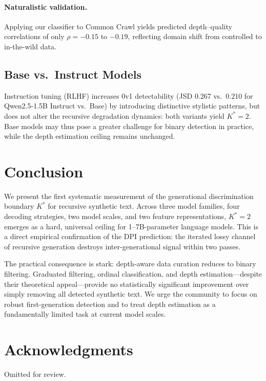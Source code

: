\documentclass[11pt,a4paper]{article}
\begin{document}
\paragraph{Naturalistic validation.}
Applying our classifier to Common Crawl yields predicted depth--quality correlations of only $\rho=-0.15$ to $-0.19$, reflecting domain shift from controlled to in-the-wild data.

\subsection{Base vs.\ Instruct Models}

Instruction tuning (RLHF) increases 0v1 detectability (JSD 0.267 vs.\ 0.210 for Qwen2.5-1.5B Instruct vs.\ Base) by introducing distinctive stylistic patterns, but does not alter the recursive degradation dynamics: both variants yield $K^*=2$.
Base models may thus pose a greater challenge for binary detection in practice, while the depth estimation ceiling remains unchanged.

\section{Conclusion}

We present the first systematic measurement of the generational discrimination boundary $K^*$ for recursive synthetic text.
Across three model families, four decoding strategies, two model scales, and two feature representations, $K^*=2$ emerges as a hard, universal ceiling for 1--7B-parameter language models.
This is a direct empirical confirmation of the DPI prediction: the iterated lossy channel of recursive generation destroys inter-generational signal within two passes.

The practical consequence is stark: depth-aware data curation reduces to binary filtering.
Graduated filtering, ordinal classification, and depth estimation---despite their theoretical appeal---provide no statistically significant improvement over simply removing all detected synthetic text.
We urge the community to focus on robust first-generation detection and to treat depth estimation as a fundamentally limited task at current model scales.

\section*{Acknowledgments}
Omitted for review.
\end{document}
